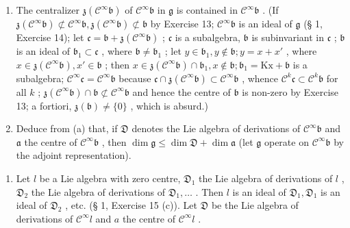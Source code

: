 \begin{enumerate}
\def\labelenumi{(\alph{enumi})}
\item
  The centralizer \(\mathfrak{z}(\mathcal{C}^{\infty}\mathfrak{b})\) of \(\mathcal{C}^{\infty}\mathfrak{b}\) in \(\mathfrak{g}\) is contained in \(\mathcal{C}^{\infty}\mathfrak{b}\) . (If \(\mathfrak{z}(\mathcal{C}^{\infty}\mathfrak{b})\not\subset\mathcal{C}^{\infty}\mathfrak{b},\mathfrak{z}(\mathcal{C}^{\infty}\mathfrak{b})\not\subset\mathfrak{b}\) by Exercise 13; \(\mathcal{C}^{\infty}\mathfrak{b}\) is an ideal of \(\mathfrak{g}\) (§ 1, Exercise 14); let \(\mathfrak{c}=\mathfrak{b}+\mathfrak{z}(\mathcal{C}^{\infty}\mathfrak{b})\) ; \(\mathfrak{c}\) is a subalgebra, \(\mathfrak{b}\) is subinvariant in \(\mathfrak{c}\) ; \(\mathfrak{b}\) is an ideal of \(\mathfrak{b}_{1}\subset\mathfrak{c}\) , where \(\mathfrak{b}\neq\mathfrak{b}_{1}\) ; let \(y\in\mathfrak{b}_{1},y\notin\mathfrak{b};y=x+x'\) , where \(x\in\mathfrak{z}(\mathcal{C}^{\infty}\mathfrak{b}),x'\in\mathfrak{b}\) ; then \(x\in\mathfrak{z}(\mathcal{C}^{\infty}\mathfrak{b})\cap\mathfrak{b}_{1},x\notin\mathfrak{b};\mathfrak{b}_{1}=\mathrm{Kx}+\mathfrak{b}\) is a subalgebra; \(\mathcal{C}^{\infty}\mathfrak{c}=\mathcal{C}^{\infty}\mathfrak{b}\) because \(\mathfrak{c}\cap\mathfrak{z}(\mathcal{C}^{\infty}\mathfrak{b})\subset\mathcal{C}^{\infty}\mathfrak{b}\) , whence \(\mathcal{C}^{k}\mathfrak{c}\subset\mathcal{C}^{k}\mathfrak{b}\) for all \(k\) ; \(\mathfrak{z}(\mathcal{C}^{\infty}\mathfrak{b})\cap\mathfrak{b}\not\subset\mathcal{C}^{\infty}\mathfrak{b}\) and hence the centre of \(\mathfrak{b}\) is non-zero by Exercise 13; a fortiori, \(\mathfrak{z}(\mathfrak{b})\neq\{0\}\) , which is absurd.)
\item
  Deduce from (a) that, if \(\mathfrak{D}\) denotes the Lie algebra of derivations of \(\mathcal{C}^{\infty}\mathfrak{b}\) and \(\mathfrak{a}\) the centre of \(\mathcal{C}^{\infty}\mathfrak{b}\) , then \(\dim \mathfrak{g} \leqslant \dim \mathfrak{D} + \dim \mathfrak{a}\) (let \(\mathfrak{g}\) operate on \(\mathcal{C}^{\infty}\mathfrak{b}\) by the adjoint representation).
\end{enumerate}

\begin{enumerate}
\def\labelenumi{\arabic{enumi}.}
\setcounter{enumi}{14}
\tightlist
\item
  Let \(l\) be a Lie algebra with zero centre, \(\mathfrak{D}_1\) the Lie algebra of derivations of \(l\) , \(\mathfrak{D}_2\) the Lie algebra of derivations of \(\mathfrak{D}_1, \ldots\) . Then \(l\) is an ideal of \(\mathfrak{D}_1, \mathfrak{D}_1\) is an ideal of \(\mathfrak{D}_2\) , etc. (§ 1, Exercise 15 (c)). Let \(\mathfrak{D}\) be the Lie algebra of derivations of \(\mathcal{C}^\infty l\) and \(a\) the centre of \(\mathcal{C}^\infty l\) .
\end{enumerate}

